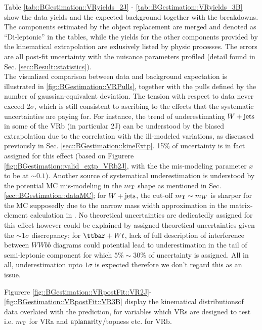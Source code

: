 Table \ref{tab::BGestimation::VRyields_2J} - \ref{tab::BGestimation::VRyields_3B} show the data yields and the expected background together with the breakdowns. 
The components estimated by the object replacement are merged and denoted as ``Di-leptonic'' in the tables, 
while the yields for the other components provided by the kinematical extrapolation are exlusively listed by physic processes. 
The errors are all post-fit uncertainty with the nuisance parameters profiled (detail found in Sec. \ref{sec::Result::statistics}). \\

The visualized comparison between data and background expectation is illustrated in \ref{fig::BGestimation::VRPulls}, together with the pulls defined by the number of gaussian-equivalent deviation. 
The tension with respect to data never exceed $2\sigma$, which is still consistent to ascribing to the effects that the systematic uncertainties are paying for. For instance, the trend of underestimating $W+\mathrm{jets}$ in some of the VRb (in particular 2J) can be understood by the biased extrapolation due to the correlation with the ill-modeled variations, as discussed previously in Sec. \ref{sec::BGestimation::kineExtp}. 15$\%$ of uncertainty is in fact assigned for this effect (based on Figurere \ref{fig::BGestimation::valid_extp_VRb2J}, with the the mis-modeling parameter $x$ to be at $\sim0.1$).
Another source of systematical underestimation is understood by the potential MC mis-modeling in the $m_{\mathrm{T}}$ shape as mentioned in Sec. \ref{sec::BGestimation::dataMC}; for $W+\mathrm{jets}$, the cut-off $m_{\mathrm{T}}\sim m_W$ is sharper for the MC supposedly due to the narrow mass width approximation in the matrix-element calculation in \sherpa. No theoretical uncertainties are dedicatedly assigned for this effect however could be explained by assigned theoretical uncertainties given the $\sim 1 \sigma$ discrepancy; for $\ttbar+Wt$, lack of full description of interference between $WWbb$ diagrams could potential lead to underestimation in the tail of semi-leptonic component for which $5\% \sim 30\%$ of uncertainty is assigned. 
All in all, underestimation upto $1\sigma$ is expected therefore we don't regard this as an issue. 

Figurere \ref{fig::BGestimation::VRpostFit::VR2J}-\ref{fig::BGestimation::VRpostFit::VR3B} display the kinematical distributionsof data overlaied with the prediction, for variables which VRs are designed to test i.e. $m_{\mathrm{T}}$ for VRa and $\mathrm{aplanarity}$/topness etc. for VRb. \\


